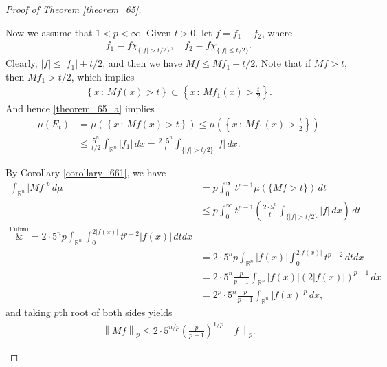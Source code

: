 \documentclass[11pt]{book}
\theoremstyle{definition}
\numberwithin{equation}{chapter}
\begin{document}
\begin{proof}[Proof of Theorem \ref{theorem_65}]
\begin{enumerate}[label=(\alph*)]
    Now we assume that $1 < p < \infty$. Given $t > 0$, let $f = f_1 + f_2$, where 
    \begin{align*}
        f_1 = f\chi_{\{\left|f\right| > t/2\}}, \quad f_2 = f\chi_{\{\left|f\right| \leq t/2\}}.
    \end{align*}
    Clearly, $\left|f\right| \leq \left|f_1\right| + t/2$, and then we have $Mf \leq Mf_1 + t/2$. Note that if $Mf > t$, then $Mf_1 > t/2$, which implies
    \begin{align*}
        \left\{x \,:\, Mf(x) > t\right\} 
        \subset \left\{x \,:\, Mf_1(x) > \frac{t}{2}\right\}.
    \end{align*}
    And hence \ref{theorem_65_a} implies 
    \begin{align*}
        \mu(E_t) & = \mu(\left\{x \,:\, Mf(x) > t\right\}) \leq \mu \left(\left\{x \,:\, Mf_1(x) > \frac{t}{2}\right\}\right) \\
        & \leq \frac{5^n}{t/2} \int_{\mathbb{R}^n} \left|f_1\right| \,dx = \frac{2 \cdot 5^n}{t} \int_{\{\left|f\right| > t/2\}} \left|f\right| \,dx. 
    \end{align*}
    
    By Corollary \ref{corollary_661}, we have
    \begin{align*}
        \int_{\mathbb{R}^n} \left|Mf\right|^p \,d\mu & = p \int^\infty_0 t^{p-1} \mu(\{Mf > t\}) \,dt \\ 
        & \leq p \int^\infty_0 t^{p-1} \left(\frac{2 \cdot 5^n}{t} \int_{\{\left|f\right| > t/2\}} \left|f\right| \,dx\right) \,dt \\
        \overset{\text{Fubini}}&{=} 2 \cdot 5^n p \int_{\mathbb{R}^n} \int^{2\left|f(x)\right|}_0 t^{p-2} \left|f(x)\right| \,dtdx \\
        & = 2 \cdot 5^n p \int_{\mathbb{R}^n} \left|f(x)\right| \int^{2\left|f(x)\right|}_0 t^{p-2} \, dtdx \\
        & = 2 \cdot 5^n \frac{p}{p-1}  \int_{\mathbb{R}^n} \left|f(x)\right| \left(2\left|f(x)\right|\right)^{p-1} \,dx \\
        & = 2^p \cdot 5^n \frac{p}{p-1} \int_{\mathbb{R}^n} \left|f(x)\right|^p \,dx,
    \end{align*}
    and taking $p$th root of both sides yields
    \begin{align*}
        \left\|Mf\right\|_p \leq 2 \cdot 5^{n/p} \left(\frac{p}{p-1}\right)^{1/p} \left\|f\right\|_p.
    \end{align*}
\end{enumerate}
\end{proof}
\end{document}
